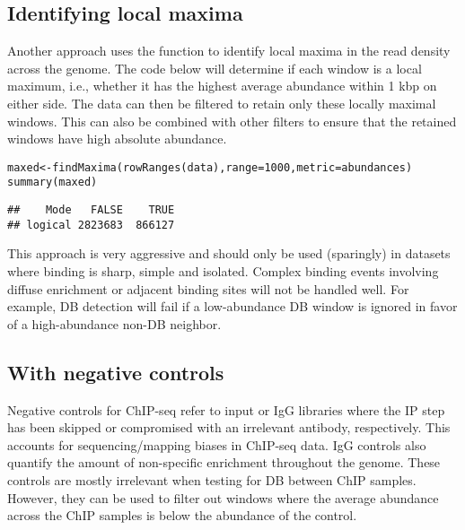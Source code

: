 \documentclass{report}\usepackage[]{graphicx}\usepackage[usenames,dvipsnames]{color}
\newcommand{\hlnum}[1]{\textcolor[rgb]{0.816,0.125,0.439}{#1}}%
\newcommand{\hlstd}[1]{\textcolor[rgb]{0.251,0.251,0.251}{#1}}%
\newcommand{\hlkwb}[1]{\textcolor[rgb]{0,0,0}{#1}}%
\newcommand{\hlkwc}[1]{\textcolor[rgb]{0.251,0.251,0.251}{#1}}%
\newcommand{\hlkwd}[1]{\textcolor[rgb]{0.878,0.439,0.125}{#1}}%
\newenvironment{knitrout}{}{} %
\begin{document}
\subsection{Identifying local maxima}
\label{sec:localmax}
Another approach uses the  function to identify local maxima in the read density across the genome.
The code below will determine if each window is a local maximum, i.e., whether it has the highest average abundance within 1 kbp on either side.
The data can then be filtered to retain only these locally maximal windows.
This can also be combined with other filters to ensure that the retained windows have high absolute abundance.

\begin{knitrout}
\color{fgcolor}\begin{kframe}
\begin{alltt}
\hlstd{maxed} \hlkwb{<-} \hlkwd{findMaxima}\hlstd{(}\hlkwd{rowRanges}\hlstd{(data),} \hlkwc{range}\hlstd{=}\hlnum{1000}\hlstd{,} \hlkwc{metric}\hlstd{=abundances)}
\hlkwd{summary}\hlstd{(maxed)}
\end{alltt}
\begin{verbatim}
##    Mode   FALSE    TRUE 
## logical 2823683  866127
\end{verbatim}
\end{kframe}
\end{knitrout}

This approach is very aggressive and should only be used (sparingly) in datasets where binding is sharp, simple and isolated.
Complex binding events involving diffuse enrichment or adjacent binding sites will not be handled well.
For example, DB detection will fail if a low-abundance DB window is ignored in favor of a high-abundance non-DB neighbor.

\subsection{With negative controls}
Negative controls for ChIP-seq refer to input or IgG libraries where the IP step has been skipped or compromised with an irrelevant antibody, respectively. 
This accounts for sequencing/mapping biases in ChIP-seq data. 
IgG controls also quantify the amount of non-specific enrichment throughout the genome. 
These controls are mostly irrelevant when testing for DB between ChIP samples. 
However, they can be used to filter out windows where the average abundance across the ChIP samples is below the abundance of the control. 
\end{document}
